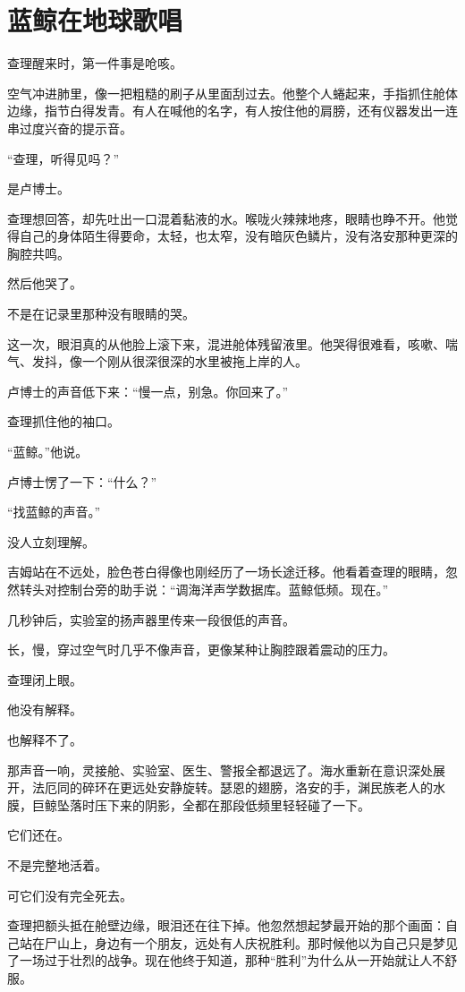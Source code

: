 \chapter{蓝鲸在地球歌唱}

查理醒来时，第一件事是呛咳。

空气冲进肺里，像一把粗糙的刷子从里面刮过去。他整个人蜷起来，手指抓住舱体边缘，指节白得发青。有人在喊他的名字，有人按住他的肩膀，还有仪器发出一连串过度兴奋的提示音。

“查理，听得见吗？”

是卢博士。

查理想回答，却先吐出一口混着黏液的水。喉咙火辣辣地疼，眼睛也睁不开。他觉得自己的身体陌生得要命，太轻，也太窄，没有暗灰色鳞片，没有洛安那种更深的胸腔共鸣。

然后他哭了。

不是在记录里那种没有眼睛的哭。

这一次，眼泪真的从他脸上滚下来，混进舱体残留液里。他哭得很难看，咳嗽、喘气、发抖，像一个刚从很深很深的水里被拖上岸的人。

卢博士的声音低下来：“慢一点，别急。你回来了。”

查理抓住他的袖口。

“蓝鲸。”他说。

卢博士愣了一下：“什么？”

“找蓝鲸的声音。”

没人立刻理解。

吉姆站在不远处，脸色苍白得像也刚经历了一场长途迁移。他看着查理的眼睛，忽然转头对控制台旁的助手说：“调海洋声学数据库。蓝鲸低频。现在。”

几秒钟后，实验室的扬声器里传来一段很低的声音。

长，慢，穿过空气时几乎不像声音，更像某种让胸腔跟着震动的压力。

查理闭上眼。

他没有解释。

也解释不了。

那声音一响，灵接舱、实验室、医生、警报全都退远了。海水重新在意识深处展开，法厄同的碎环在更远处安静旋转。瑟恩的翅膀，洛安的手，渊民族老人的水膜，巨鲸坠落时压下来的阴影，全都在那段低频里轻轻碰了一下。

它们还在。

不是完整地活着。

可它们没有完全死去。

查理把额头抵在舱壁边缘，眼泪还在往下掉。他忽然想起梦最开始的那个画面：自己站在尸山上，身边有一个朋友，远处有人庆祝胜利。那时候他以为自己只是梦见了一场过于壮烈的战争。现在他终于知道，那种“胜利”为什么从一开始就让人不舒服。

